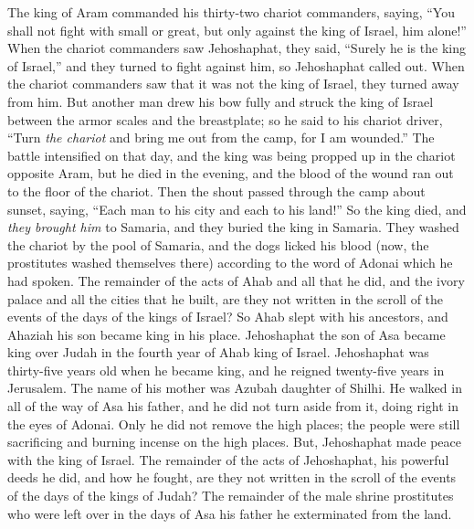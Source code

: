 \begin{biblechapter}
\verse The king of Aram commanded his thirty-two chariot commanders, saying, “You shall not fight with small or great, but only against the king of Israel, him alone!”
\verse When the chariot commanders saw Jehoshaphat, they said, “Surely he is the king of Israel,” and they turned to fight against him, so Jehoshaphat called out.
\verse When the chariot commanders saw that it was not the king of Israel, they turned away from him.
\verse But another man drew his bow fully and struck the king of Israel between the armor scales and the breastplate; so he said to his chariot driver, “Turn \textit{the chariot} and bring me out from the camp, for I am wounded.”
\verse The battle intensified on that day, and the king was being propped up in the chariot opposite Aram, but he died in the evening, and the blood of the wound ran out to the floor of the chariot.
\verse Then the shout passed through the camp about sunset, saying, “Each man to his city and each to his land!”
\verse So the king died, and \textit{they brought him} to Samaria, and they buried the king in Samaria.
\verse They washed the chariot by the pool of Samaria, and the dogs licked his blood (now, the prostitutes washed themselves there) according to the word of Adonai which he had spoken.
\verse The remainder of the acts of Ahab and all that he did, and the ivory palace and all the cities that he built, are they not written in the scroll of the events of the days of the kings of Israel?
\verse So Ahab slept with his ancestors, and Ahaziah his son became king in his place.
 Jehoshaphat the son of Asa became king over Judah in the fourth year of Ahab king of Israel.
\verse Jehoshaphat was thirty-five years old when he became king, and he reigned twenty-five years in Jerusalem. The name of his mother was Azubah daughter of Shilhi.
\verse He walked in all of the way of Asa his father, and he did not turn aside from it, doing right in the eyes of Adonai. Only he did not remove the high places; the people were still sacrificing and burning incense on the high places.
\verse {} But, Jehoshaphat made peace with the king of Israel.
\verse The remainder of the acts of Jehoshaphat, his powerful deeds he did, and how he fought, are they not written in the scroll of the events of the days of the kings of Judah?
\verse The remainder of the male shrine prostitutes who were left over in the days of Asa his father he exterminated from the land.

\end{biblechapter}
